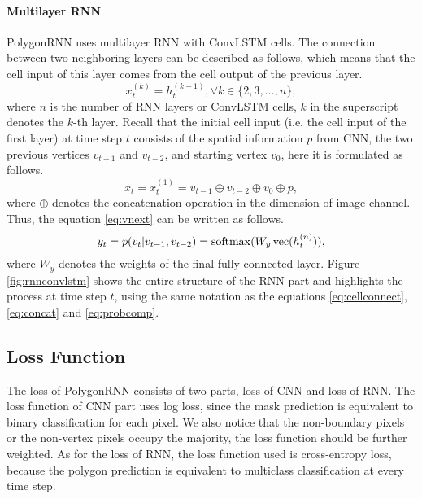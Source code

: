

\paragraph{Multilayer RNN}
PolygonRNN uses multilayer RNN with ConvLSTM cells. The connection between two neighboring layers can be described as follows, which means that the cell input of this layer comes from the cell output of the previous layer.
\begin{equation}\label{eq:cellconnect}
	x_t^{(k)} = h_t^{(k-1)}, \forall k \in \{2,3,\ldots,n\},
\end{equation}
where $n$ is the number of RNN layers or ConvLSTM cells, $k$ in the superscript denotes the $k$-th layer. Recall that the initial cell input (i.e. the cell input of the first layer) at time step $t$ consists of the spatial information $p$ from CNN, the two previous vertices $v_{t-1}$ and $v_{t-2}$, and starting vertex $v_0$, here it is formulated as follows.
\begin{equation}\label{eq:concat}
	x_t = x_t^{(1)} = v_{t-1} \oplus v_{t-2} \oplus v_0 \oplus p,
\end{equation}
where $\oplus$ denotes the concatenation operation in the dimension of image channel. Thus, the equation \ref{eq:vnext} can be written as follows.
\begin{equation}\label{eq:probcomp}
	y_t = p(v_t|v_{t-1}, v_{t-2}) = \operatorname{softmax}(W_y\operatorname{vec}(h_t^{(n)})),
\end{equation}
where $W_y$ denotes the weights of the final fully connected layer. Figure \ref{fig:rnnconvlstm} shows the entire structure of the RNN part and highlights the process at time step $t$, using the same notation as the equations \ref{eq:cellconnect}, \ref{eq:concat} and \ref{eq:probcomp}.



\subsection{Loss Function}
The loss of PolygonRNN consists of two parts, loss of CNN and loss of RNN. The loss function of CNN part uses log loss, since the mask prediction is equivalent to binary classification for each pixel. We also notice that the non-boundary pixels or the non-vertex pixels occupy the majority, the loss function should be further weighted. As for the loss of RNN, the loss function used is cross-entropy loss, because the polygon prediction is equivalent to multiclass classification at every time step.

